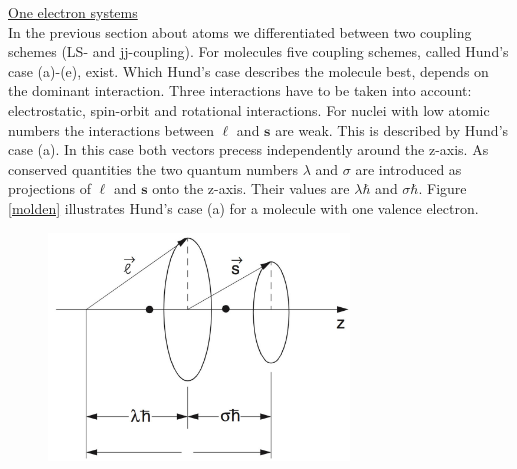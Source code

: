 \documentclass[parskip,12pt,headsepline,a4paper] {scrbook}
\begin{document}
\underline{One electron systems} \\
In the previous section about atoms we differentiated between two coupling schemes (LS- and jj-coupling). For molecules five coupling schemes, called Hund's case (a)-(e), exist. Which Hund's case  describes the molecule best, depends on the dominant interaction. Three interactions have to be taken into account: electrostatic, spin-orbit and rotational interactions.
For nuclei with low atomic numbers the interactions between $\boldsymbol{\ell}$ and $\mathbf{s}$ are weak. This is described by Hund's case (a). In this case both vectors precess independently around the z-axis. As conserved quantities the two quantum numbers $\lambda$ and $\sigma$ are introduced as projections of $\boldsymbol{\ell}$ and $\mathbf{s}$ onto the z-axis. Their values are $\lambda \hbar$ and $\sigma \hbar$. Figure \ref{molden} illustrates Hund's case (a) for a molecule with one valence electron.

\begin{figure}[ht]
\centerline{
\includegraphics[width=8cm]{./spectroscopy/ls-mol.jpg}}
\end{figure}
\end{document}
